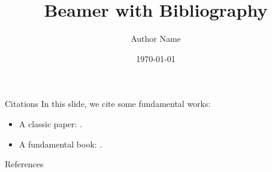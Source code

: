 \documentclass[aspectratio=169]{beamer}
\title{Beamer with Bibliography}
\author{Author Name}
\date{\today}
\begin{document}
\begin{frame}
    \titlepage
\end{frame}

\begin{frame}{Citations}
    In this slide, we cite some fundamental works:
    \begin{itemize}
        \item A classic paper: \textcite{knuth1984}.
        \item A fundamental book: \parencite{lamport1994}.
    \end{itemize}
\end{frame}

\begin{frame}[allowframebreaks]{References}
    \printbibliography
\end{frame}
\end{document}
